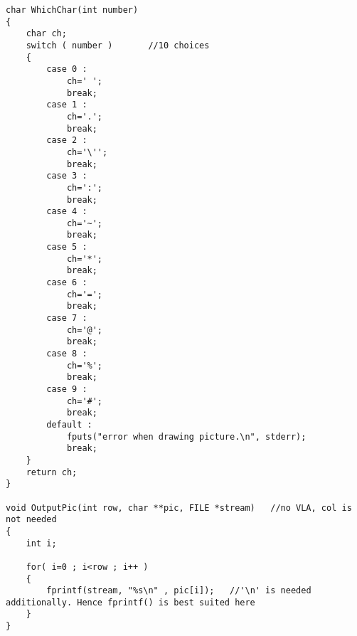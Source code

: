 \begin{solution}
\begin{verbatim}
char WhichChar(int number)
{
	char ch;
	switch ( number )		//10 choices
	{
		case 0 :
			ch=' ';
			break;
		case 1 :
			ch='.';
			break;
		case 2 :
			ch='\'';
			break;
		case 3 :
			ch=':';
			break;
		case 4 :
			ch='~';
			break;
		case 5 :
			ch='*';
			break;
		case 6 :
			ch='=';
			break;
		case 7 :
			ch='@';
			break;
		case 8 :
			ch='%';
			break;
		case 9 :
			ch='#';
			break;
		default :
			fputs("error when drawing picture.\n", stderr);
			break;
	}
	return ch;
}

void OutputPic(int row, char **pic, FILE *stream)	//no VLA, col is not needed
{
	int i;

	for( i=0 ; i<row ; i++ )
	{
		fprintf(stream, "%s\n" , pic[i]);	//'\n' is needed additionally. Hence fprintf() is best suited here
	}
}
  \end{verbatim}
\end{solution}

